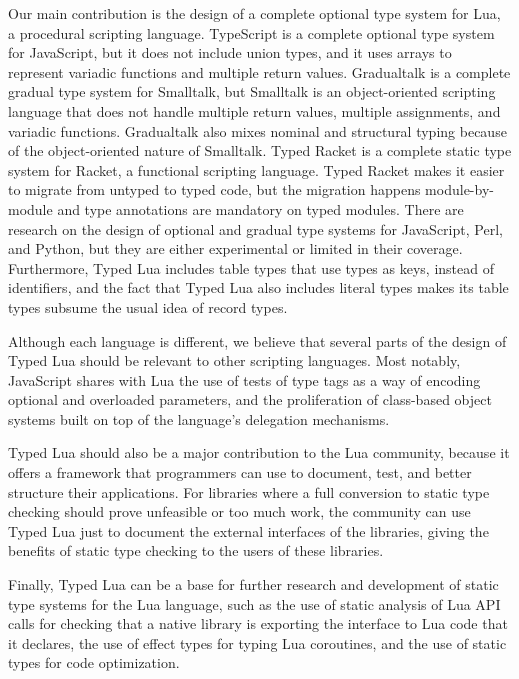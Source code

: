 \documentclass[preprint]{sig-alternate}
\begin{document}
Our main contribution is the design of a complete optional type system
for Lua, a procedural scripting language.
TypeScript is a complete optional type system for JavaScript,
but it does not include union types, and it uses arrays to represent
variadic functions and multiple return values. 
Gradualtalk is a complete gradual type system for Smalltalk,
but Smalltalk is an object-oriented scripting language that does
not handle multiple return values, multiple assignments, and
variadic functions.
Gradualtalk also mixes nominal and structural typing because of
the object-oriented nature of Smalltalk.
Typed Racket is a complete static type system for Racket, a functional
scripting language.
Typed Racket makes it easier to migrate from untyped to typed code,
but the migration happens module-by-module and type annotations are
mandatory on typed modules.
There are research on the design of optional and gradual type systems
for JavaScript, Perl, and Python, but they are either experimental or
limited in their coverage.
Furthermore, Typed Lua includes table types that use types as keys,
instead of identifiers, and the fact that Typed Lua also includes
literal types makes its table types subsume the usual idea of
record types.

Although each language is different, we believe that several parts of
the design of Typed Lua should be relevant to other scripting languages.
Most notably, JavaScript shares with Lua the use of tests of type tags
as a way of encoding optional and overloaded parameters, and the
proliferation of class-based object systems built on top of the
language's delegation mechanisms.

Typed Lua should also be a major contribution to the Lua community,
because it offers a framework that programmers can use to document,
test, and better structure their applications.
For libraries where a full conversion to static type checking should
prove unfeasible or too much work, the community can use Typed Lua
just to document the external interfaces of the libraries,
giving the benefits of static type checking to the users of these
libraries.

Finally, Typed Lua can be a base for further research and development
of static type systems for the Lua language, such as the use of static
analysis of Lua API calls for checking that a native library is
exporting the interface to Lua code that it declares, the use of
effect types for typing Lua coroutines, and the use of static types
for code optimization.



\end{document}

